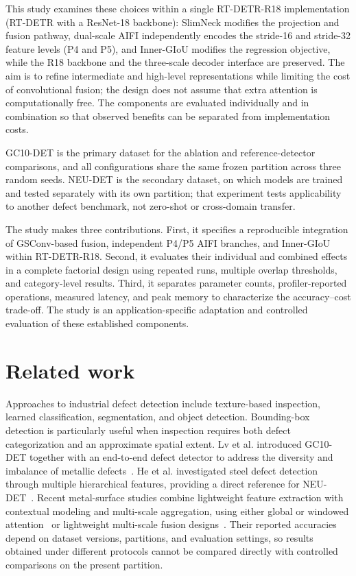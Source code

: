 \documentclass[pdflatex,sn-mathphys-num,iicol]{sn-jnl}
\begin{document}
This study examines these choices within a single RT-DETR-R18 implementation (RT-DETR with a ResNet-18 backbone): SlimNeck modifies the projection and fusion pathway, dual-scale AIFI independently encodes the stride-16 and stride-32 feature levels (P4 and P5), and Inner-GIoU modifies the regression objective, while the R18 backbone and the three-scale decoder interface are preserved. The aim is to refine intermediate and high-level representations while limiting the cost of convolutional fusion; the design does not assume that extra attention is computationally free. The components are evaluated individually and in combination so that observed benefits can be separated from implementation costs.

GC10-DET is the primary dataset for the ablation and reference-detector comparisons, and all configurations share the same frozen partition across three random seeds. NEU-DET is the secondary dataset, on which models are trained and tested separately with its own partition; that experiment tests applicability to another defect benchmark, not zero-shot or cross-domain transfer.

The study makes three contributions. First, it specifies a reproducible integration of GSConv-based fusion, independent P4/P5 AIFI branches, and Inner-GIoU within RT-DETR-R18. Second, it evaluates their individual and combined effects in a complete factorial design using repeated runs, multiple overlap thresholds, and category-level results. Third, it separates parameter counts, profiler-reported operations, measured latency, and peak memory to characterize the accuracy--cost trade-off. The study is an application-specific adaptation and controlled evaluation of these established components.

\section{Related work}\label{sec:related}

Approaches to industrial defect detection include texture-based inspection, learned classification, segmentation, and object detection. Bounding-box detection is particularly useful when inspection requires both defect categorization and an approximate spatial extent. Lv et al. introduced GC10-DET together with an end-to-end defect detector to address the diversity and imbalance of metallic defects~\cite{lv2020gc10}. He et al. investigated steel defect detection through multiple hierarchical features, providing a direct reference for NEU-DET~\cite{he2020neudet}. Recent metal-surface studies combine lightweight feature extraction with contextual modeling and multi-scale aggregation, using either global or windowed attention~\cite{guo2024railtransformer,liu2024cgtdnet,zhou2024shuntedswin,zhou2024gdalr,wei2025rfaconvvit,mia2025std2} or lightweight multi-scale fusion designs~\cite{xie2024lmsyolo,li2025smalltarget,sanjaya2025metallic,ge2025yolomsd,wan2025dfsdnet,wang2024swinyolov5,huang2026surface,chen2025hctdet}. Their reported accuracies depend on dataset versions, partitions, and evaluation settings, so results obtained under different protocols cannot be compared directly with controlled comparisons on the present partition.
\end{document}
